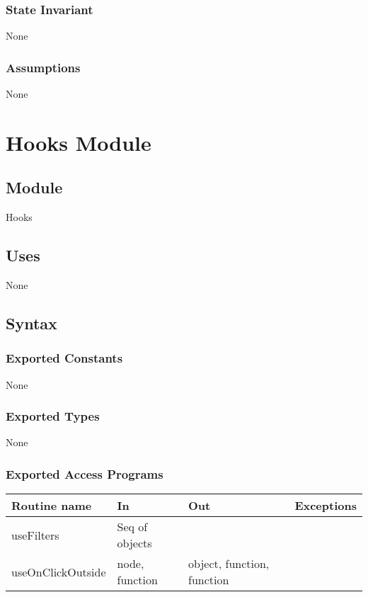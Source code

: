 \documentclass[12pt]{article}
\begin{document}
\subsubsection{State Invariant}
None

\subsubsection{Assumptions}
None

\newpage

\section{Hooks Module}

\subsection{Module}
Hooks

\subsection{Uses}
None

\subsection{Syntax}

\subsubsection{Exported Constants}

None

\subsubsection{Exported Types}

None

\subsubsection{Exported Access Programs}

\begin{tabular}{| l | l | l | p{5cm} |}
\hline
\textbf{Routine name} & \textbf{In} & \textbf{Out} & \textbf{Exceptions}\\
\hline
useFilters & Seq of objects & & \\
\hline
useOnClickOutside & node, function & object, function, function & \\
\hline

\end{tabular}
\end{document}
